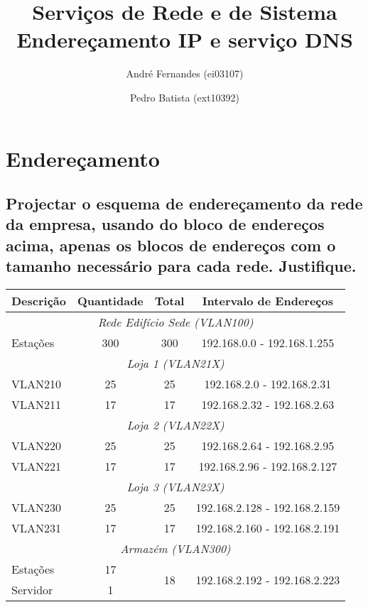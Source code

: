 \documentclass[a4paper,12pt]{article}
\title{Serviços de Rede e de Sistema \\
	Endereçamento IP e serviço DNS}
\author{André Fernandes (ei03107) \and Pedro Batista (ext10392)}
\begin{document}
	\maketitle

	\section{Endereçamento}
	\subsection{Projectar o esquema de endereçamento da rede da empresa,
		usando do bloco de endereços acima, apenas os blocos de endereços com
			o tamanho necessário para cada rede. Justifique.}

			\begin{table}[h]
			\centering
			\begin{tabular}{ l | c | c | c }
			\toprule
			\textbf{Descrição} & \textbf{Quantidade} & \textbf{Total} & \textbf{Intervalo de Endereços} \\\hline
			
			\multicolumn{4}{c}{\textit{Rede Edifício Sede (VLAN100)}} \\ \hline
			Estações & 300 & 300 & 192.168.0.0 - 192.168.1.255 \\ \hline
				
			\multicolumn{4}{c}{\textit{Loja 1 (VLAN21X)}} \\\hline
			VLAN210 & 25 & 25 & 192.168.2.0 - 192.168.2.31 \\\hline
			VLAN211 & 17 & 17 & 192.168.2.32 - 192.168.2.63 \\\hline
				
			\multicolumn{4}{c}{\textit{Loja 2 (VLAN22X)}} \\\hline
			VLAN220 & 25 & 25 & 192.168.2.64 - 192.168.2.95 \\\hline
			VLAN221 & 17 & 17 & 192.168.2.96 - 192.168.2.127\\\hline
				
			\multicolumn{4}{c}{\textit{Loja 3 (VLAN23X)}} \\\hline
			VLAN230 & 25 & 25 & 192.168.2.128 - 192.168.2.159 \\\hline
			VLAN231 & 17 & 17 & 192.168.2.160 - 192.168.2.191 \\\hline
				
			\multicolumn{4}{c}{\textit{Armazém (VLAN300)}} \\\hline
			Estações & 17 & \multirow{2}{*}{18} & \multirow{2}{*}{192.168.2.192 - 192.168.2.223} \\\cline{1-2}
			Servidor & 1 & \\\hline 
			

\end{tabular}
\end{table}
\end{document}
